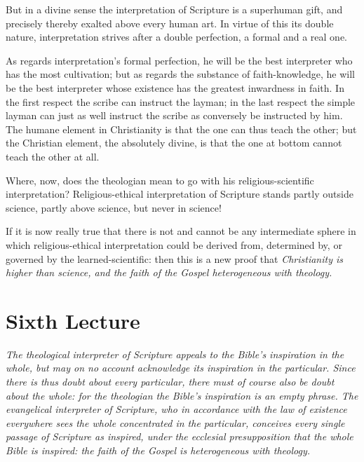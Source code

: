 \documentclass[12pt,a4paper]{book}
\begin{document}
But in a divine sense the interpretation of Scripture is a superhuman gift, and precisely
thereby exalted above every human art. In virtue of this its double nature, interpretation
strives after a double perfection, a formal and a real one.

As regards interpretation's formal perfection, he will be the best interpreter who has the
most cultivation; but as regards the substance of faith-knowledge, he will be the best
interpreter whose existence has the greatest inwardness in faith. In the first respect the
scribe can instruct the layman; in the last respect the simple layman can just as well
instruct the scribe as conversely be instructed by him. The humane element in Christianity
is that the one can thus teach the other; but the Christian element, the absolutely divine,
is that the one at bottom cannot teach the other at all.

Where, now, does the theologian mean to go with his religious-scientific interpretation?
Religious-ethical interpretation of Scripture stands partly outside science, partly above
science, but never in science!

If it is now really true that there is not and cannot be any intermediate sphere in which
religious-ethical interpretation could be derived from, determined by, or governed by the
learned-scientific: then this is a new proof that \emph{Christianity is higher than science,
and the faith of the Gospel heterogeneous with theology.}

\chapter*{Sixth Lecture}
\label{ch:forel6}

\begin{center}\itshape
The theological interpreter of Scripture appeals to the Bible's inspiration
in the whole, but may on no account acknowledge its inspiration in the
particular. Since there is thus doubt about every particular, there must of
course also be doubt about the whole: for the theologian the Bible's
inspiration is an empty phrase. The evangelical interpreter of Scripture,
who in accordance with the law of existence everywhere sees the whole
concentrated in the particular, conceives every single passage of Scripture
as inspired, under the ecclesial presupposition that the whole Bible is
inspired: the faith of the Gospel is heterogeneous with theology.
\end{center}
\end{document}
